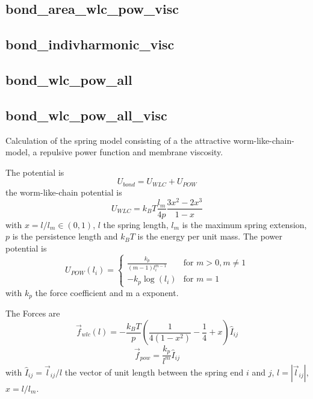 \documentclass[a4paper,10pt]{scrreprt}
\begin{document}
\subsection{bond\_area\_wlc\_pow\_visc}

\subsection{bond\_indivharmonic\_visc}

\subsection{bond\_wlc\_pow\_all}

\subsection{bond\_wlc\_pow\_all\_visc}

Calculation of the spring model consisting of a the attractive worm-like-chain-model, a repulsive power function and membrane viscosity.

The potential is
%
\begin{equation}\label{eq:ubond}
	U_{bond} = U_{WLC} + U_{POW}
\end{equation}
%
the worm-like-chain potential is
%
\begin{equation}\label{eq:uwlc}
	U_{WLC} = k_BT\frac{l_m}{4p}\frac{3x^2-2x^3}{1-x} 
\end{equation}
%
with  $x=l/l_m \in (0,1)$, $l$ the spring length, $l_m$ is the maximum spring extension, $p$ is the persistence length and $k_BT$ is the energy per unit mass. 
The power potential is
% 
\begin{equation}\label{eq:upow}
 U_{POW}(l_i)=\begin{cases}
             \frac{k_p}{(m-1)l_i^{m-1}} & \text{for \ } m>0, m \neq 1 \\
		-k_p\log{(l_i)} & \text{for \ } m=1
            \end{cases}
\end{equation}
%
with $k_p$ the force coefficient and m a exponent.

The Forces are
%
\begin{equation}\label{eq:fwlc}
	\vec{f}_{wlc}(l) = -\frac{k_BT}{p}\left(\frac{1}{4(1-x^2)}-\frac{1}{4}+x\right)\hat{I}_{ij}
\end{equation}
%
\begin{equation}\label{eq:fpow}
	\vec{f}_{pow}=\frac{k_p}{l^m}\hat{I}_{ij}
\end{equation}
%
with $\hat{I}_{ij}=\vec{l}_{ij}/l$ the vector of unit length between the spring end $i$ and $j$, $l=|\vec{l}_{ij}|$, $x=l/l_m$.
\end{document}
